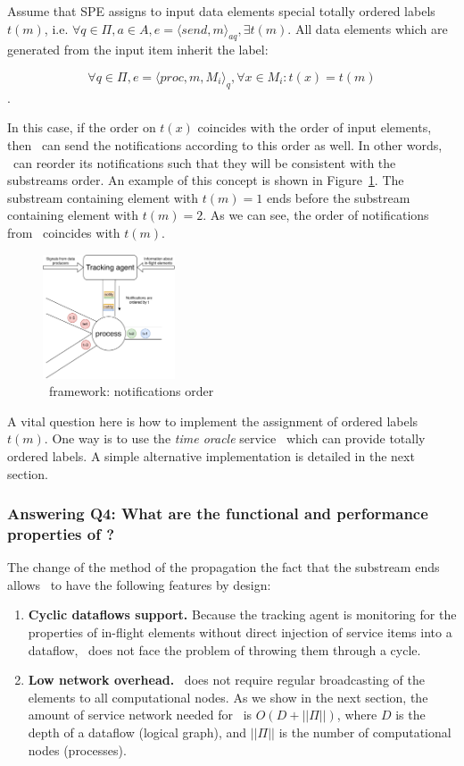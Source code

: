Assume that SPE assigns to input data elements special totally ordered labels $t(m)$, i.e. $\forall q\in \Pi,a\in A, e=\langle send,m\rangle_{aq}, \exists t(m)$. All data elements which are generated from the input item inherit the label: 

$$\forall q\in \Pi, e=\langle proc,m,M_i\rangle_q, \forall x \in M_i : t(x) = t(m)$$.

In this case, if the order on $t(x)$ coincides with the order of input elements, then \tracker\ can send the notifications according to this order as well. In other words, \tracker\ can reorder its notifications such that they will be consistent with the substreams order. An example of this concept is shown in Figure~\ref{tracker_ordering}. The substream containing element with $t(m)=1$ ends before the substream containing element with $t(m)=2$. As we can see, the order of notifications from \tracker\ coincides with $t(m)$.

\begin{figure}[htbp]
  \centering
  \includegraphics[width=0.35\textwidth]{pics/tracker-ordering.pdf}
  \caption{\tracker\ framework: notifications order}
  \label{tracker_ordering}
\end{figure}

A vital question here is how to implement the assignment of ordered labels $t(m)$. One way is to use the {\em time oracle} service~\cite{???} which can provide totally ordered labels. A simple alternative implementation is detailed in the next section. 

\subsubsection{Answering Q4: What are the functional and performance properties of \tracker?}

The change of the method of the propagation the fact that the substream ends allows \tracker\ to have the following features by design:

\begin{enumerate}
    \item {\bf Cyclic dataflows support.} Because the tracking agent is monitoring for the properties of in-flight elements without direct injection of service items into a dataflow, \tracker\ does not face the problem of throwing them through a cycle.
    \item {\bf Low network overhead.} \tracker\ does not require regular broadcasting of the elements to all computational nodes. As we show in the next section, the amount of service network needed for \tracker\ is $O(D+||\Pi||)$, where $D$ is the depth of a dataflow (logical graph), and $||\Pi||$ is the number of computational nodes (processes). 
\end{enumerate}

